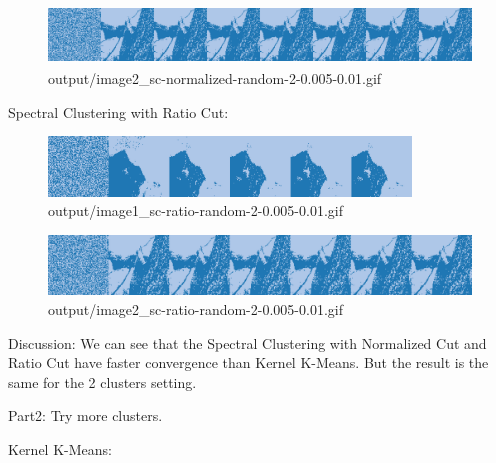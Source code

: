 \documentclass{homework}
\begin{document}
\begin{figure}[H]
    \centering
    \includegraphics[height=1.6cm]{output_flatgif/flatgif_image2_sc-normalized-random-2-0.005-0.01.png}
    \caption{output/image2\_sc-normalized-random-2-0.005-0.01.gif}
\end{figure}

Spectral Clustering with Ratio Cut:

\begin{figure}[H]
    \centering
    \includegraphics[height=1.6cm]{output_flatgif/flatgif_image1_sc-ratio-random-2-0.005-0.01.png}
    \caption{output/image1\_sc-ratio-random-2-0.005-0.01.gif}
\end{figure}

\begin{figure}[H]
    \centering
    \includegraphics[height=1.6cm]{output_flatgif/flatgif_image2_sc-ratio-random-2-0.005-0.01.png}
    \caption{output/image2\_sc-ratio-random-2-0.005-0.01.gif}
\end{figure}

Discussion: We can see that the Spectral Clustering with Normalized Cut and Ratio Cut have faster convergence than Kernel K-Means. But the result is the same for the 2 clusters setting.

\vspace{1em}

Part2: Try more clusters.

Kernel K-Means:
\end{document}
